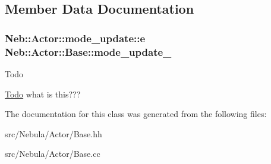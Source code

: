 \subsection{\-Member \-Data \-Documentation}
\hypertarget{classNeb_1_1Actor_1_1Base_ad51160f955b8bff638c938360ff3ce00}{
\subsubsection[{mode\-\_\-update\-\_\-}]{\setlength{\rightskip}{0pt plus 5cm}\-Neb\-::\-Actor\-::mode\-\_\-update\-::e {\bf \-Neb\-::\-Actor\-::\-Base\-::mode\-\_\-update\-\_\-}}}\label{classNeb_1_1Actor_1_1Base_ad51160f955b8bff638c938360ff3ce00}
\begin{DoxyRefDesc}{\-Todo}
\item[\hyperlink{todo__todo000002}{\-Todo}]what is this??? \end{DoxyRefDesc}


\-The documentation for this class was generated from the following files\-:\begin{DoxyCompactItemize}
\item 
src/\-Nebula/\-Actor/\-Base.\-hh\item 
src/\-Nebula/\-Actor/\-Base.\-cc\end{DoxyCompactItemize}
